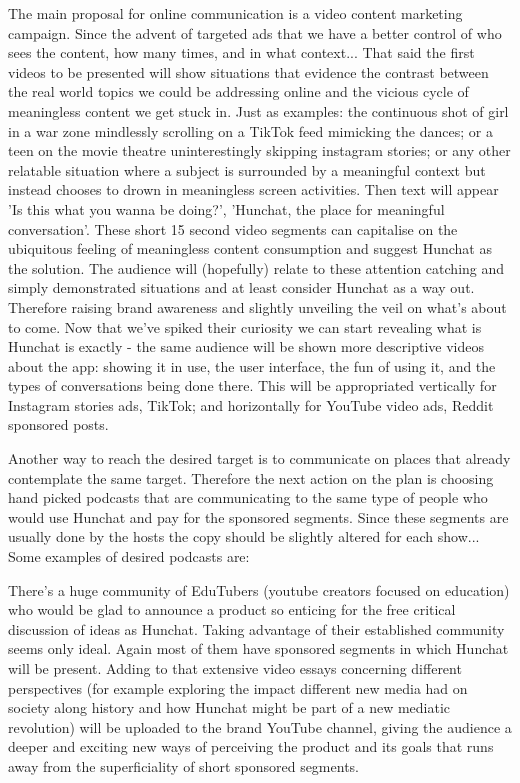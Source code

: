 \documentclass[12pt]{article}
\begin{document}
	The main proposal for online communication is a video content marketing campaign. Since the advent of targeted ads that we have a better control of who sees the content, how many times, and in what context... That said the first videos to be presented will show situations that evidence the contrast between the real world topics we could be addressing online and the vicious cycle of meaningless content we get stuck in. Just as examples: the continuous shot of girl in a war zone mindlessly scrolling on a TikTok feed mimicking the dances; or a teen on the movie theatre uninterestingly skipping instagram stories; or any other relatable situation where a subject is surrounded by a meaningful context but instead chooses to drown in meaningless screen activities. Then text will appear 'Is this what you wanna be doing?', 'Hunchat, the place for meaningful conversation'. These short 15 second video segments can capitalise on the ubiquitous feeling of meaningless content consumption and suggest Hunchat as the solution. The audience will (hopefully) relate to these attention catching and simply demonstrated situations and at least consider Hunchat as a way out. Therefore raising brand awareness and slightly unveiling the veil on what's about to come. Now that we've spiked their curiosity we can start revealing what is Hunchat is exactly - the same audience will be shown more descriptive videos about the app: showing it in use, the user interface, the fun of using it, and the types of conversations being done there. This will be appropriated vertically for Instagram stories ads, TikTok; and horizontally for YouTube video ads, Reddit sponsored posts.
	
	Another way to reach the desired target is to communicate on places that already contemplate the same target. Therefore the next action on the plan is choosing hand picked podcasts that are communicating to the same type of people who would use Hunchat and pay for the sponsored segments. Since these segments are usually done by the hosts the copy should be slightly altered for each show... Some examples of desired podcasts are: 
	
	There's a huge community of EduTubers (youtube creators focused on education) who would be glad to announce a product so enticing for the free critical discussion of ideas as Hunchat. Taking advantage of their established community seems only ideal. Again most of them have sponsored segments in which Hunchat will be present. Adding to that extensive video essays concerning different perspectives (for example exploring the impact different new media had on society along history and how Hunchat might be part of a new mediatic revolution) will be uploaded to the brand YouTube channel, giving the audience a deeper and exciting new ways of perceiving the product and its goals that runs away from the superficiality of short sponsored segments.
	
\end{document}
